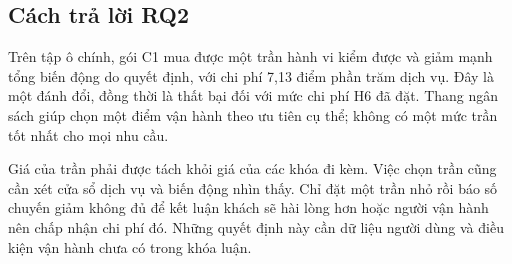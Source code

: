 \subsection{Cách trả lời RQ2}

Trên tập ô chính, gói C1 mua được một trần hành vi kiểm được và giảm mạnh tổng biến
động do quyết định, với chi phí 7,13 điểm phần trăm dịch vụ. Đây là một đánh đổi, đồng
thời là thất bại đối với mức chi phí H6 đã đặt. Thang ngân sách giúp chọn một điểm
vận hành theo ưu tiên cụ thể; không có một mức trần tốt nhất cho mọi nhu cầu.

Giá của trần phải được tách khỏi giá của các khóa đi kèm. Việc chọn trần cũng cần xét
cửa sổ dịch vụ và biến động nhìn thấy. Chỉ đặt một trần nhỏ rồi báo số chuyến giảm
không đủ để kết luận khách sẽ hài lòng hơn hoặc người vận hành nên chấp nhận chi phí
đó. Những quyết định này cần dữ liệu người dùng và điều kiện vận hành chưa có trong
khóa luận.
